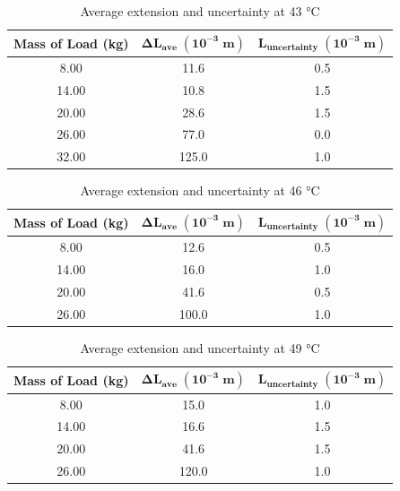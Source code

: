 \documentclass{article}
\begin{document}
\begin{table}[H]
\centering
\caption{Average extension and uncertainty at 43 °C}
\label{tab:my-table}
\begin{tabular}{|c|c|c|}
\hline
\textbf{Mass of Load (kg)} & \textbf{$\boldsymbol{\Delta L_{ave}\; (10^{-3}\;  m)}$} & \textbf{$\boldsymbol{L_{uncertainty}\; (10^{-3}\;  m)}$} \\ \hline
8.00 & 11.6 & 0.5 \\ \hline
14.00 & 10.8 & 1.5 \\ \hline
20.00 & 28.6 & 1.5 \\ \hline
26.00 & 77.0 & 0.0 \\ \hline
32.00 & 125.0 & 1.0 \\ \hline
\end{tabular}
\end{table}

\begin{table}[h]
\centering
\caption{Average extension and uncertainty at 46 °C}
\label{tab:my-table}
\begin{tabular}{|c|c|c|}
\hline
\textbf{Mass of Load (kg)} & \textbf{$\boldsymbol{\Delta L_{ave}\; (10^{-3}\;  m)}$} & \textbf{$\boldsymbol{L_{uncertainty}\; (10^{-3}\;  m)}$} \\ \hline
8.00 & 12.6 & 0.5 \\ \hline
14.00 & 16.0 & 1.0 \\ \hline
20.00 & 41.6 & 0.5 \\ \hline
26.00 & 100.0 & 1.0 \\ \hline
\end{tabular}
\end{table}



\begin{table}[]
\centering
\caption{Average extension and uncertainty at 49 °C}
\label{tab:my-table}
\begin{tabular}{|c|c|c|}
\hline
\textbf{Mass of   Load (kg)} & \textbf{$\boldsymbol{\Delta L_{ave}\; (10^{-3}\;  m)}$} & \textbf{$\boldsymbol{L_{uncertainty}\; (10^{-3}\;  m)}$} \\ \hline
8.00 & 15.0 & 1.0 \\ \hline
14.00 & 16.6 & 1.5 \\ \hline
20.00 & 41.6 & 1.5 \\ \hline
26.00 & 120.0 & 1.0 \\ \hline
\end{tabular}
\end{table}
\end{document}
